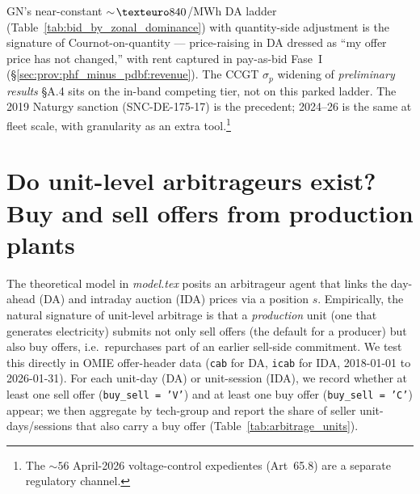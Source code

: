 \documentclass[11pt,a4paper]{article}
\begin{document}
\noindent GN's near-constant $\sim\!\texteuro 840$/MWh DA ladder (Table~\ref{tab:bid_by_zonal_dominance}) with quantity-side adjustment is the signature of Cournot-on-quantity --- price-raising in DA dressed as ``my offer price has not changed,'' with rent captured in pay-as-bid Fase~I (\S\ref{sec:prov:phf_minus_pdbf:revenue}). The CCGT $\sigma_p$ widening of \emph{preliminary results} \S A.4 sits on the in-band competing tier, not on this parked ladder. The 2019 Naturgy sanction (SNC-DE-175-17) is the precedent; 2024--26 is the same at fleet scale, with granularity as an extra tool.\footnote{The $\sim\!56$ April-2026 voltage-control expedientes (Art~65.8) are a separate regulatory channel.}

\section{Do unit-level arbitrageurs exist? Buy and sell offers from production plants}\label{sec:prov:arbitrage_units}

The theoretical model in \emph{model.tex} posits an arbitrageur agent that links the day-ahead (DA) and intraday auction (IDA) prices via a position $s$. Empirically, the natural signature of unit-level arbitrage is that a \emph{production} unit (one that generates electricity) submits not only sell offers (the default for a producer) but also buy offers, i.e.\ repurchases part of an earlier sell-side commitment. We test this directly in OMIE offer-header data (\texttt{cab} for DA, \texttt{icab} for IDA, 2018-01-01 to 2026-01-31). For each unit-day (DA) or unit-session (IDA), we record whether at least one sell offer (\texttt{buy\_sell = 'V'}) and at least one buy offer (\texttt{buy\_sell = 'C'}) appear; we then aggregate by tech-group and report the share of seller unit-days/sessions that also carry a buy offer (Table~\ref{tab:arbitrage_units}).
\end{document}
